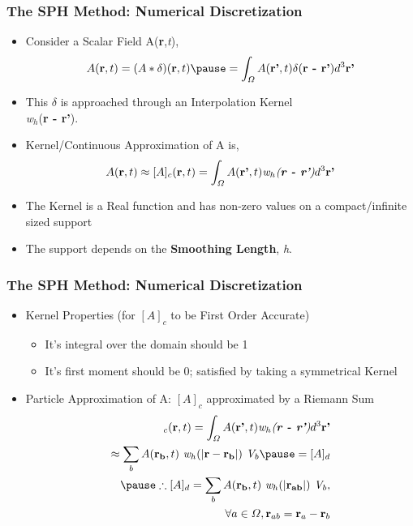\documentclass{beamer}
\begin{document}
 \begin{frame} %
  \frametitle{The SPH Method: Numerical Discretization}
  \begin{itemize}
  \item Consider a Scalar Field A(\textbf{r},\textit{t}), 
   \begin{eqnarray}
    A(\textbf{r},t)  = (A\ast \delta)(\textbf{r},t) \pause 
                     = \int_{\varOmega} A(\textbf{r'},t) \delta (\textbf{r - r'}) d^{3}\textbf{r'} \nonumber
   \end{eqnarray} \pause
  \item This $\delta$ is approached through an Interpolation Kernel \\ \textit{w$_h$}(\textbf{r - r'}). \pause 
  \item Kernel/Continuous Approximation of A is,
   \begin{eqnarray}
    A(\textbf{r},t) \approx [A]_{c}(\textbf{r},t)= \int_{\varOmega} A(\textbf{r'},t) \textit{w$_h$(\textbf{r - r'})} d^{3}\textbf{r'} \nonumber
   \end{eqnarray} \pause
   \item The Kernel is a Real function and has non-zero values on a compact/infinite sized support
   \item The support depends on the \textbf{Smoothing Length}, \textit{h}.
  \end{itemize}
 \end{frame}
% 
 \begin{frame} %
  \frametitle{The SPH Method: Numerical Discretization}
  \begin{itemize}
   \item Kernel Properties (for $[A]_{c}$ to be First Order Accurate)
   \begin{itemize}
    \item It's integral over the domain should be 1
    \item It's first moment should be 0; \pause satisfied by taking a symmetrical Kernel
   \end{itemize} \pause
   \item Particle Approximation of A: $[A]_{c}$ approximated by a Riemann Sum
    \begin{eqnarray}
     [A]_{c}(\textbf{r},t) = \int_{\varOmega} A(\textbf{r'},t) \textit{w$_h$(\textbf{r - r'})} d^{3}\textbf{r'} \nonumber \\
     \approx \sum_{b}A(\textbf{$\bf{r}_b$},t)~\textit{w$_h$}(\textbf{$|\bf{r}-\bf{r}_b |$}) ~ \textit{V$_b$}\pause = [A]_{d} \nonumber \\ \pause
     \therefore [A]_{d} = \sum_{b}A(\textbf{$\bf{r}_b$},t)~\textit{w$_h$}(\textbf{$|\bf{r}_{ab} |$}) ~ \textit{V$_b$} ,\nonumber \\ 
     \forall a \in  \varOmega , \textbf{r}_{ab} = \textbf{r}_{a} - \textbf{r}_{b}  \nonumber
   \end{eqnarray}
 \end{itemize}
 \end{frame}
\end{document}
